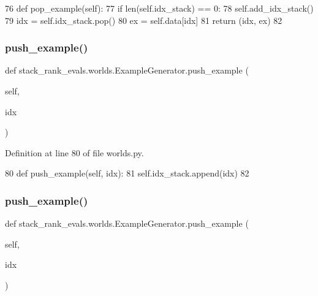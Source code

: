 \begin{DoxyCode}
76     \textcolor{keyword}{def }pop\_example(self):
77         \textcolor{keywordflow}{if} len(self.idx\_stack) == 0:
78             self.add\_idx\_stack()
79         idx = self.idx\_stack.pop()
80         ex = self.data[idx]
81         \textcolor{keywordflow}{return} (idx, ex)
82 
\end{DoxyCode}
\mbox{\label{classstack__rank__evals_1_1worlds_1_1ExampleGenerator_a75b62011b063cb2879cca50917383d0e}} 
\subsubsection{\texorpdfstring{push\+\_\+example()}{push\_example()}\hspace{0.1cm}{\footnotesize\ttfamily [1/2]}}
{\footnotesize\ttfamily def stack\+\_\+rank\+\_\+evals.\+worlds.\+Example\+Generator.\+push\+\_\+example (\begin{DoxyParamCaption}\item[{}]{self,  }\item[{}]{idx }\end{DoxyParamCaption})}



Definition at line 80 of file worlds.\+py.


\begin{DoxyCode}
80     \textcolor{keyword}{def }push\_example(self, idx):
81         self.idx\_stack.append(idx)
82 
\end{DoxyCode}
\mbox{\label{classstack__rank__evals_1_1worlds_1_1ExampleGenerator_a75b62011b063cb2879cca50917383d0e}} 
\subsubsection{\texorpdfstring{push\+\_\+example()}{push\_example()}\hspace{0.1cm}{\footnotesize\ttfamily [2/2]}}
{\footnotesize\ttfamily def stack\+\_\+rank\+\_\+evals.\+worlds.\+Example\+Generator.\+push\+\_\+example (\begin{DoxyParamCaption}\item[{}]{self,  }\item[{}]{idx }\end{DoxyParamCaption})}



